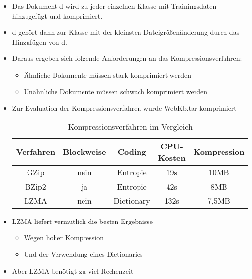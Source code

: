 \begin{frame}[c]
\begin{itemize}
  \item Das Dokument d wird zu jeder einzelnen Klasse mit Trainingsdaten
  hinzugefügt und komprimiert.
  \item d gehört dann zur Klasse mit der kleinsten Dateigrößenänderung durch das
  Hinzufügen von d.
  \item Daraus ergeben sich folgende Anforderungen an das Kompressionsverfahren:
  \begin{itemize}
    \item Ähnliche Dokumente müssen stark komprimiert werden
    \item Unähnliche Dokumente müssen schwach komprimiert werden
  \end{itemize}
\end{itemize}
\end{frame}

\begin{frame}[c]
\begin{itemize}
\item Zur Evaluation der Kompressionsverfahren wurde WebKb.tar komprimiert
  \begin{table}
\begin{tabular}{|c|c|c|c|c|}
\hline
Verfahren & Blockweise & Coding & CPU-Kosten & Kompression\\
\hline
GZip & nein & Entropie & 19s & 10MB \\
BZip2 & ja & Entropie & 42s & 8MB \\
LZMA & nein & Dictionary & 132s & 7,5MB \\
\hline
\end{tabular}
\caption{Kompressionsverfahren im Vergleich}
\label{tbl:CompressionRatio}
\end{table}
\item LZMA liefert vermutlich die besten Ergebnisse
\begin{itemize}
  \item Wegen hoher Kompression
  \item Und der Verwendung eines Dictionaries
\end{itemize}
\item Aber LZMA benötigt zu viel Rechenzeit
\end{itemize}

\end{frame}

